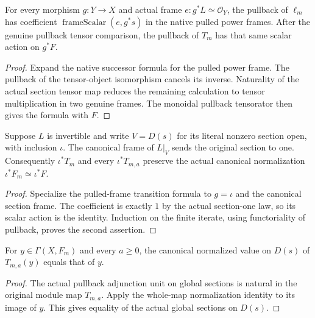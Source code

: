 \begin{lemma}
\label{lem:cech-line-native-pulled-transition-frame}
\leanok
For every morphism $g:Y\to X$ and actual frame
$e:g^*L\simeq\mathcal O_Y$, the pullback of $\ell_m$ has coefficient
$\operatorname{frameScalar}(e,g^*s)$ in the native pulled power frames.
After the genuine pullback tensor comparison, the pullback of $T_m$
has that same scalar action on $g^*F$.
\end{lemma}
\begin{proof}
Expand the native successor formula for the pulled power frame. The
pullback of the tensor-object isomorphism cancels its inverse.
Naturality of the actual section tensor map reduces the remaining
calculation to tensor multiplication in two genuine frames.
The monoidal pullback tensorator then gives the formula with $F$.
\end{proof}

\begin{lemma}
\label{lem:cech-line-native-transition-normalized}
\leanok
Suppose $L$ is invertible and write $V=D(s)$ for its literal nonzero
section open, with inclusion $\iota$. The canonical frame of $L|_V$
sends the original section to one. Consequently $\iota^*T_m$ and every
$\iota^*T_{m,a}$ preserve the actual canonical normalization
$\iota^*F_m\simeq\iota^*F$.
\end{lemma}
\begin{proof}
Specialize the pulled-frame transition formula to $g=\iota$ and the
canonical section frame. The coefficient is exactly $1$ by the actual
section-one law, so its scalar action is the identity. Induction on the
finite iterate, using functoriality of pullback, proves the second assertion.
\end{proof}

\begin{lemma}
\label{lem:cech-line-native-top-transition}
\leanok
For $y\in\Gamma(X,F_m)$ and every $a\geq0$, the canonical normalized
value on $D(s)$ of $T_{m,a}(y)$ equals that of $y$.
\end{lemma}
\begin{proof}
The actual pullback adjunction unit on global sections is natural in
the original module map $T_{m,a}$. Apply the whole-map normalization
identity to its image of $y$. This gives equality of the actual global
sections on $D(s)$.
\end{proof}

